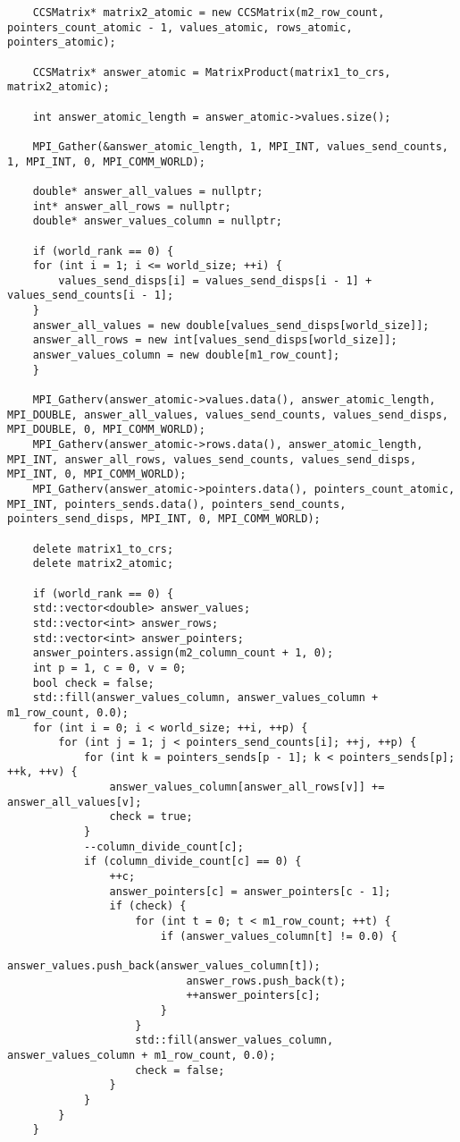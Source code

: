 \documentclass{report}
\begin{document}
\begin{lstlisting}
    CCSMatrix* matrix2_atomic = new CCSMatrix(m2_row_count, pointers_count_atomic - 1, values_atomic, rows_atomic, pointers_atomic);

    CCSMatrix* answer_atomic = MatrixProduct(matrix1_to_crs, matrix2_atomic);

    int answer_atomic_length = answer_atomic->values.size();

    MPI_Gather(&answer_atomic_length, 1, MPI_INT, values_send_counts, 1, MPI_INT, 0, MPI_COMM_WORLD);

    double* answer_all_values = nullptr;
    int* answer_all_rows = nullptr;
    double* answer_values_column = nullptr;

    if (world_rank == 0) {
    for (int i = 1; i <= world_size; ++i) {
        values_send_disps[i] = values_send_disps[i - 1] + values_send_counts[i - 1];
    }
    answer_all_values = new double[values_send_disps[world_size]];
    answer_all_rows = new int[values_send_disps[world_size]];
    answer_values_column = new double[m1_row_count];
    }

    MPI_Gatherv(answer_atomic->values.data(), answer_atomic_length, MPI_DOUBLE, answer_all_values, values_send_counts, values_send_disps, MPI_DOUBLE, 0, MPI_COMM_WORLD);
    MPI_Gatherv(answer_atomic->rows.data(), answer_atomic_length, MPI_INT, answer_all_rows, values_send_counts, values_send_disps, MPI_INT, 0, MPI_COMM_WORLD);
    MPI_Gatherv(answer_atomic->pointers.data(), pointers_count_atomic, MPI_INT, pointers_sends.data(), pointers_send_counts, pointers_send_disps, MPI_INT, 0, MPI_COMM_WORLD);

    delete matrix1_to_crs;
    delete matrix2_atomic;

    if (world_rank == 0) {
    std::vector<double> answer_values;
    std::vector<int> answer_rows;
    std::vector<int> answer_pointers;
    answer_pointers.assign(m2_column_count + 1, 0);
    int p = 1, c = 0, v = 0;
    bool check = false;
    std::fill(answer_values_column, answer_values_column + m1_row_count, 0.0);
    for (int i = 0; i < world_size; ++i, ++p) {
        for (int j = 1; j < pointers_send_counts[i]; ++j, ++p) {
            for (int k = pointers_sends[p - 1]; k < pointers_sends[p]; ++k, ++v) {
                answer_values_column[answer_all_rows[v]] += answer_all_values[v];
                check = true;
            }
            --column_divide_count[c];
            if (column_divide_count[c] == 0) {
                ++c;
                answer_pointers[c] = answer_pointers[c - 1];
                if (check) {
                    for (int t = 0; t < m1_row_count; ++t) {
                        if (answer_values_column[t] != 0.0) {
                            answer_values.push_back(answer_values_column[t]);
                            answer_rows.push_back(t);
                            ++answer_pointers[c];
                        }
                    }
                    std::fill(answer_values_column, answer_values_column + m1_row_count, 0.0);
                    check = false;
                }
            }
        }
    }


\end{lstlisting}
\end{document}
